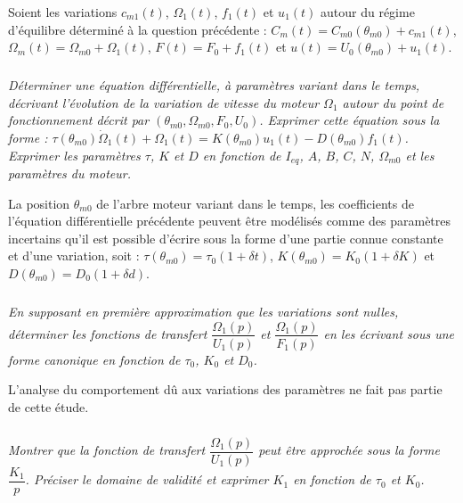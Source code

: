 Soient les variations $c_{m1}(t)$, $\Omega_1(t)$, $f_1(t)$ et $u_1(t)$ autour du régime d’équilibre
déterminé à la question précédente :
$C_m(t)=C_{m0}\left( \theta_{m0}\right)+c_{m1}(t)$, $\Omega_m(t)=\Omega_{m0}+\Omega_1(t)$, 
$F(t)=F_0+f_1(t)$ et $u(t)=U_0\left(\theta_{m0} \right)+u_1(t)$.



\subparagraph{}
\textit{Déterminer une équation différentielle, à paramètres variant dans le temps,
décrivant l’évolution de la variation de vitesse du moteur $\Omega_1$ autour du point de
fonctionnement décrit par $\left( \theta_{m0}, \Omega_{m0}, F_0, U_0\right)$. Exprimer cette équation sous la
forme : $\tau\left(\theta_{m0}\right)\dot{\Omega}_1(t)+{\Omega}_1(t)=K\left( \theta_{m0} \right)u_1(t)-D\left( \theta_{m0} \right)f_1(t)$.
Exprimer les paramètres $\tau$, $K$ et $D$ en fonction de $I_{eq}$, $A$, $B$, $C$, $N$, $\Omega_{m0}$ et les
paramètres du moteur.}
\ifprof
\begin{corrige}
\end{corrige}
\else
\fi


La position $\theta_{m0}$ de l’arbre moteur variant dans le temps, les coefficients de
l’équation différentielle précédente peuvent être modélisés comme des paramètres incertains qu’il est possible d’écrire sous la forme d’une partie connue constante
et d’une variation, soit :
$\tau\left(\theta_{m0}\right)=\tau_0\left(1+\delta t \right)$, $K\left(\theta_{m0}\right)=K_0\left(1+\delta K \right)$
et $D\left(\theta_{m0}\right)=D_0\left(1+\delta d \right)$.


\subparagraph{}
\textit{En supposant en première approximation que les variations sont nulles, déterminer
les fonctions de transfert $\dfrac{\Omega_1(p)}{U_1(p)}$ et $\dfrac{\Omega_1(p)}{F_1(p)}$ en les écrivant
sous une forme canonique en fonction de $\tau_0$, $K_0$ et $D_0$.}
\ifprof
\begin{corrige}
\end{corrige}
\else
\fi

 \begin{rem}L’analyse du comportement dû aux variations des paramètres ne
fait pas partie de cette étude.
\end{rem}



\subparagraph{}
\textit{Montrer que la fonction de transfert $\dfrac{\Omega_1(p)}{U_1(p)}$ peut être approchée sous
la forme $\dfrac{K_1}{p}$. Préciser le domaine de validité et exprimer $K_1$ en fonction de $\tau_0$
et $K_0$.}
\ifprof
\begin{corrige}
\end{corrige}
\else
\fi


